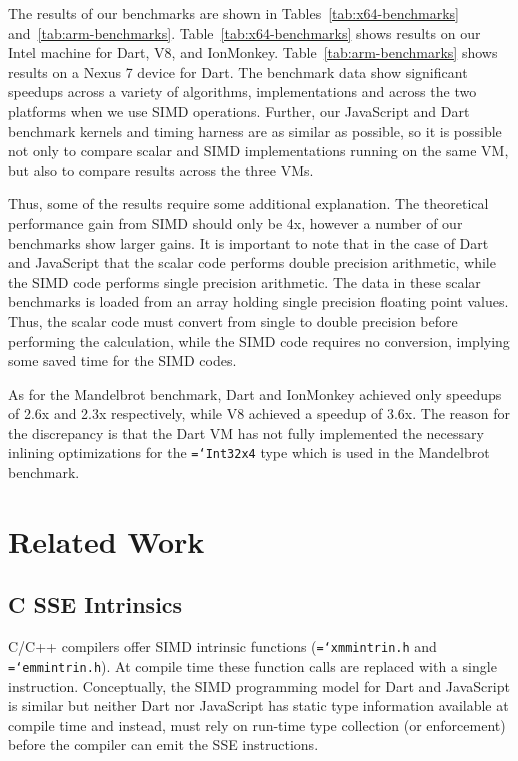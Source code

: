 \documentclass[preprint]{sigplanconf}
\newcommand{\ttt}[1]{{\texttt{\hyphenchar\font=`\-\relax #1}}}%
\begin{document}
The results of our benchmarks are shown in Tables~\ref{tab:x64-benchmarks}
and~\ref{tab:arm-benchmarks}.
%
Table~\ref{tab:x64-benchmarks} shows results on our Intel machine for Dart, V8,
and IonMonkey.
%
Table~\ref{tab:arm-benchmarks} shows results on a Nexus 7 device for Dart. 
%
The benchmark data show significant speedups across a variety of algorithms, 
implementations and across the two platforms when we use SIMD operations.
%
Further, our JavaScript and Dart benchmark kernels and timing harness are as
similar as possible, so it is possible not only to compare scalar and SIMD
implementations running on the same VM, but also to compare results across the
three VMs.


Thus, some of the results require some additional explanation.
%
The theoretical performance gain from SIMD should only be 4x, however a number
of our benchmarks show larger gains.
%
It is important to note that in the case of Dart and JavaScript that the scalar
code performs double precision arithmetic, while the SIMD code
performs single precision arithmetic.
%
The data in these scalar benchmarks is loaded from an array holding single
precision floating point values.
%
Thus, the scalar code must convert from single to double precision before
performing the calculation, while the SIMD code requires no conversion,
implying some saved time for the SIMD codes.


As for the Mandelbrot benchmark, Dart and IonMonkey achieved only speedups of
2.6x and 2.3x respectively, while V8 achieved a speedup of 3.6x.
%
The reason for the discrepancy is that the Dart VM has not fully implemented the
necessary inlining optimizations for the \ttt{Int32x4} type which is used in the
Mandelbrot benchmark.


\section{Related Work}

\subsection{C SSE Intrinsics}

C/C++ compilers offer SIMD intrinsic functions (\ttt{xmmintrin.h} and
\ttt{emmintrin.h}). At compile time these function calls are replaced with a
single instruction. Conceptually, the SIMD programming model for Dart and
JavaScript is similar but neither Dart nor JavaScript has static type
information available at compile time and instead, must rely on run-time type
collection (or enforcement) before the compiler can emit the SSE instructions.
\end{document}
